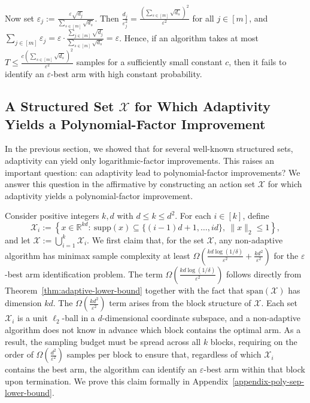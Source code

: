 Now set $\varepsilon_j:=\frac{\varepsilon\sqrt{d_j}}{\sum_{s\in[m]}\sqrt{d_s}}$. Then
$\frac{d_j}{\varepsilon_j^2}=\frac{\left(\sum_{s\in[m]}\sqrt{d_s}\right)^2}{\varepsilon^2}$ for all $j\in[m]$,
and
$\sum_{j\in[m]}\varepsilon_j=\varepsilon\cdot\frac{\sum_{j\in[m]}\sqrt{d_j}}{\sum_{s\in[m]}\sqrt{d_s}}=\varepsilon$.
Hence, if an algorithm takes at most $T\le \frac{c\left(\sum_{s\in[m]}\sqrt{d_s}\right)^2}{\varepsilon^2}$ samples for a sufficiently small constant $c$, then it fails to identify an $\varepsilon$-best arm with high constant probability.

\subsection{A Structured Set $\mathcal{X}$ for Which Adaptivity Yields a Polynomial-Factor Improvement}\label{sec:poly-adaptive}
In the previous section, we showed that for several well-known structured sets, adaptivity can yield only logarithmic-factor improvements. This raises an important question: can adaptivity lead to polynomial-factor improvements? We answer this question in the affirmative by constructing an action set $\mathcal{X}$ for which adaptivity yields a polynomial-factor improvement.

Consider positive integers $k,d$ with $d\leq k\leq d^2$. For each $i\in[k]$, define
\[
\mathcal{X}_i:=\left\{x\in\mathbb{R}^{kd}:\ \mathrm{supp}(x)\subseteq \{(i-1)d+1,\ldots,id\},\ \|x\|_2\le 1\right\},
\]
and let $\mathcal{X}:=\bigcup_{i=1}^k \mathcal{X}_i$. We first claim that, for the set $\mathcal{X}$, any non-adaptive algorithm has minimax sample complexity at least $\Omega\!\left(\frac{kd\log(1/\delta)}{\varepsilon^2}+\frac{kd^2}{\varepsilon^2}\right)$ for the $\varepsilon$-best arm identification problem. The term $\Omega\!\left(\frac{kd\log(1/\delta)}{\varepsilon^2}\right)$ follows directly from Theorem~\ref{thm:adaptive-lower-bound} together with the fact that $\mathrm{span}(\mathcal{X})$ has dimension $kd$. The $\Omega\!\left(\frac{kd^2}{\varepsilon^2}\right)$ term arises from the block structure of $\mathcal{X}$. Each set $\mathcal{X}_i$ is a unit $\ell_2$-ball in a $d$-dimensional coordinate subspace, and a non-adaptive algorithm does not know in advance which block contains the optimal arm. As a result, the sampling budget must be spread across all $k$ blocks, requiring on the order of $\Omega\!\left(\frac{d^2}{\varepsilon^2}\right)$ samples per block to ensure that, regardless of which $\mathcal{X}_i$ contains the best arm, the algorithm can identify an $\varepsilon$-best arm within that block upon termination. We prove this claim formally in Appendix~\ref{appendix-poly-sep-lower-bound}.

